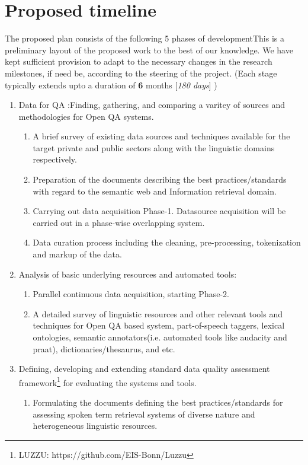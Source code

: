 \documentclass{article}
\begin{document}
\section{Proposed timeline}
The proposed plan consists of the following 5 phases of developmentThis is a preliminary layout of the proposed work to the best of our knowledge. We have kept sufficient provision to adapt to the necessary changes in the research milestones, if need be, according to the steering of the project. (Each stage typically extends upto a duration of \textbf{6} months [\textit{180 days}] )

\begin{enumerate}
\item Data for QA :Finding, gathering, and comparing a varitey of sources and methodologies for Open QA systems.
\begin{enumerate}
\item A brief survey of existing data sources and techniques available for the target private and public sectors along with the linguistic domains respectively. 
\item Preparation of the documents describing the best practices/standards with regard to the semantic web and Information retrieval domain.
\item Carrying out data acquisition Phase-1. Datasource acquisition will be carried out in a phase-wise overlapping system. 
\item Data curation process including the cleaning, pre-processing, tokenization and markup of the data.
\end{enumerate}
\item Analysis of basic underlying resources and automated tools:
\begin{enumerate}
\item Parallel continuous data acquisition, starting Phase-2.
\item A detailed survey of linguistic resources  and other relevant tools and techniques for Open QA based system, part-of-speech taggers, lexical ontologies, semantic annotators(i.e. automated tools like audacity and praat), dictionaries/thesaurus, and etc.
\end{enumerate}
\item Defining, developing and extending standard data quality assessment framework\footnote{ LUZZU: https://github.com/EIS-Bonn/Luzzu} for evaluating the systems and tools.

\begin{enumerate}
\item Formulating the documents defining the best practices/standards for assessing spoken term retrieval systems of diverse nature and heterogeneous linguistic resources.


\end{enumerate}
\end{enumerate}
\end{document}
